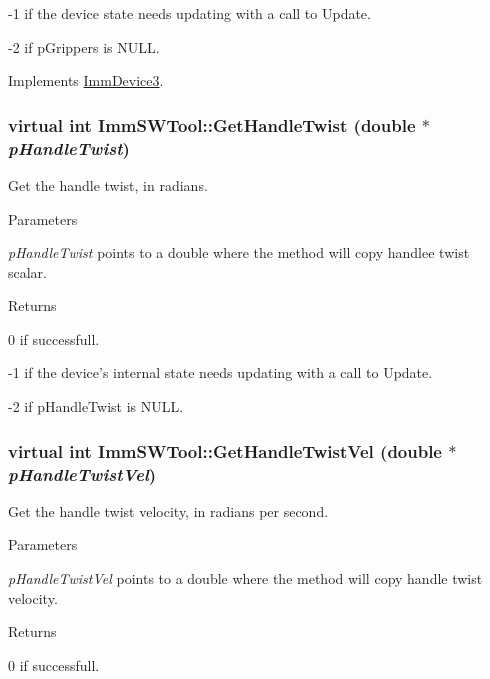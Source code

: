 -\/1 if the device state needs updating with a call to Update.

-\/2 if pGrippers is NULL. 

Implements \hyperlink{classImmDevice3_ad83c6941b396eb3e8f3acee9ed7dacfb}{ImmDevice3}.\hypertarget{classImmSWTool_a69273959bd275761a2a8fa977aa5e143}{
\subsubsection[{GetHandleTwist}]{\setlength{\rightskip}{0pt plus 5cm}virtual int ImmSWTool::GetHandleTwist (double $\ast$ {\em pHandleTwist})}}
\label{classImmSWTool_a69273959bd275761a2a8fa977aa5e143}
Get the handle twist, in radians.


\begin{DoxyParams}{Parameters}
\item[{\em pHandleTwist}]points to a double where the method will copy handlee twist scalar.\end{DoxyParams}
\begin{DoxyReturn}{Returns}

\end{DoxyReturn}
0 if successfull.

-\/1 if the device's internal state needs updating with a call to Update.

-\/2 if pHandleTwist is NULL. \hypertarget{classImmSWTool_a4c7a89a86b16049db4a188948622b995}{
\subsubsection[{GetHandleTwistVel}]{\setlength{\rightskip}{0pt plus 5cm}virtual int ImmSWTool::GetHandleTwistVel (double $\ast$ {\em pHandleTwistVel})}}
\label{classImmSWTool_a4c7a89a86b16049db4a188948622b995}
Get the handle twist velocity, in radians per second.


\begin{DoxyParams}{Parameters}
\item[{\em pHandleTwistVel}]points to a double where the method will copy handle twist velocity.\end{DoxyParams}
\begin{DoxyReturn}{Returns}

\end{DoxyReturn}
0 if successfull.

